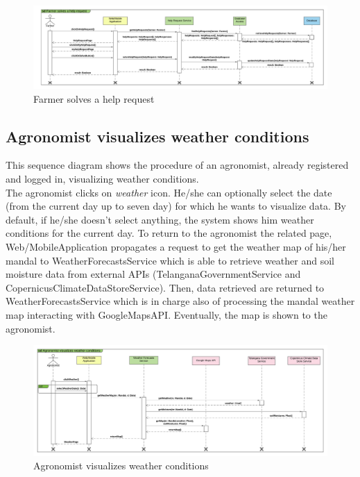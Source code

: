 \newpage
\begin{landscape}
\begin{figure}[h]
\vspace*{-2cm}
\noindent
\centering
\centerline{\includegraphics[scale= 0.108]{./Images/Sequence diagram/Farmer solves a help request.png}}
    \caption {Farmer solves a help request}
    \vspace*{-12cm}
\end{figure}
\fillandplacepagenumber
\end{landscape}

\subsection{Agronomist visualizes weather conditions}

This sequence diagram shows the procedure of an agronomist, already registered and logged in, visualizing weather conditions.\\
The agronomist clicks on \textit{weather} icon.
He/she can optionally select the date (from the current day up to seven day) for which he wants to visualize data. By default, if he/she doesn't select anything, the system shows him weather conditions for the current day. To return to the agronomist the related page, Web/MobileApplication propagates a request to get the weather map of his/her mandal to WeatherForecastsService which is able to retrieve weather and soil moisture data from external APIs (TelanganaGovernmentService and CopernicusClimateDataStoreService).
Then, data retrieved are returned to WeatherForecastsService which is in charge also of processing the mandal weather map interacting with GoogleMapsAPI.  
Eventually, the map is shown to the agronomist.

\newpage
\begin{landscape}
\begin{figure}[h]
\vspace*{-2cm}
\noindent
\centering
\centerline{\includegraphics[scale= 0.108]{./Images/Sequence diagram/Agronomist visualizes weather conditions.png}}
    \caption{Agronomist visualizes weather conditions}
    \vspace*{-12cm}
\end{figure}
\fillandplacepagenumber
\end{landscape}

